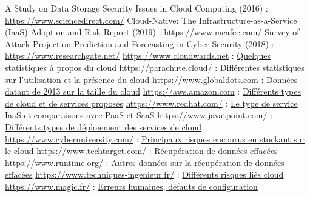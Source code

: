 \documentclass[a4paper, 12pt]{article}
\begin{document}
\begin{spacing}{1.1}
  \newpage
  \begin{thebibliography}{3}
    A Study on Data Storage Security Issues in Cloud Computing (2016) : \href{https://www.sciencedirect.com/science/article/pii/S1877050916315812}{https://www.sciencedirect.com/}
    Cloud-Native: The Infrastructure-as-a-Service (IaaS) Adoption and Risk
    Report (2019) : \href{https://www.mcafee.com/enterprise/en-us/assets/reports/restricted/rp-cloud-adoption-risk-report-iaas.pdf}{https://www.mcafee.com/}
    Survey of Attack Projection Prediction and Forecasting in Cyber Security
    (2018) : \href{https://www.researchgate.net/publication/327449459_Survey_of_Attack_Projection_Prediction_and_Forecasting_in_Cyber_Security}{https://www.researchgate.net/}
    \bibitem{} \url{https://www.cloudwards.net} : \href{https://www.cloudwards.net/cloud-computing-statistics/}{Quelques statistiques à propos du cloud}
    \bibitem{} \url{https://parachute.cloud/} : \href{https://parachute.cloud/cloud-computing-statistics/}{Différentes statistiques sur l'utilisation et la présence du cloud}
    \bibitem{} \url{https://www.globaldots.com} : \href{https://www.globaldots.com/resources/blog/how-much-is-stored-in-the-cloud/}{Données datant de 2013 sur la taille du cloud}
    \bibitem{} \url{https://aws.amazon.com} : \href{https://aws.amazon.com/fr/types-of-cloud-computing/}{Différents types de cloud et de services proposés}
    \bibitem{} \url{https://www.redhat.com/} : \href{https://www.redhat.com/fr/topics/cloud-computing/what-is-iaas}{Le type de service IaaS et comparaisons avec PaaS et SaaS}
    \bibitem{} \url{https://www.javatpoint.com/} : \href{https://www.javatpoint.com/cloud-deployment-model}{Différents types de déploiement des services de cloud}
    \bibitem{} \url{https://www.cyberuniversity.com/} : \href{https://www.cyberuniversity.com/post/la-securite-dans-le-cloud-principaux-risques-et-challenges}{Principaux risques encourus en stockant sur le cloud}
    \bibitem{} \url{https://www.techtarget.com/} : \href{https://www.techtarget.com/searchdisasterrecovery/definition/data-recovery}{Récupération de données effacées}
    \bibitem{} \url{https://www.runtime.org/} : \href{https://www.runtime.org/recoverability.htm}{Autres données sur la récupération de données effacées}
    \bibitem{} \url{https://www.techniques-ingenieur.fr/} : \href{https://www.techniques-ingenieur.fr/actualite/articles/la-securite-dans-le-cloud-une-approche-fournisseur-basee-sur-les-risques-15550/}{Différents risques liés cloud}
    \bibitem{} \url{https://www.magic.fr/} : \href{https://www.magic.fr/cloud-public-les-erreurs-de-configuration-sont-extremement-frequentes/}{Erreurs humaines, défauts de configuration}

\end{thebibliography}
\end{spacing}
\end{document}
